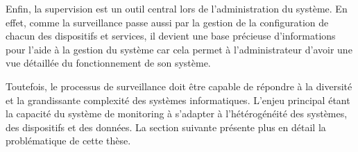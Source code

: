 Enfin, la supervision est un outil central lors de l'administration du système. En effet, comme la surveillance passe aussi par la gestion de la configuration de chacun des dispositifs et services, il devient une base précieuse d'informations pour l'aide à la gestion du système car cela permet à l'administrateur d'avoir une vue détaillée du fonctionnement de son système.

Toutefois, le processus de surveillance doit être capable de répondre à la diversité et la grandissante complexité des systèmes informatiques. L'enjeu principal étant la capacité du système de monitoring à s'adapter à  l'hétérogénéité des systèmes, des dispositifs et des données. La section suivante présente plus en détail la problématique de cette thèse.